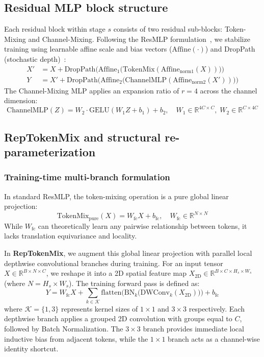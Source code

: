 \subsection{Residual MLP block structure}
\label{subsection:block_structure}
Each residual block within stage $s$ consists of two residual sub-blocks: Token-Mixing and Channel-Mixing. Following the ResMLP formulation~\cite{touvron2021resmlp}, we stabilize training using learnable affine scale and bias vectors ($\text{Affine}(\cdot)$) and DropPath (stochastic depth)~\cite{huang2016deep}:
\begin{align}
    X' &= X + \text{DropPath}\Big(\text{Affine}_1\big(\text{TokenMix}(\text{Affine}_{\text{norm}1}(X))\big)\Big) \\
    Y &= X' + \text{DropPath}\Big(\text{Affine}_2\big(\text{ChannelMLP}(\text{Affine}_{\text{norm}2}(X'))\big)\Big)
\end{align}
The Channel-Mixing MLP applies an expansion ratio of $r = 4$ across the channel dimension:
\begin{equation}
    \text{ChannelMLP}(Z) = W_2 \cdot \text{GELU}(W_1 Z + b_1) + b_2, \quad W_1 \in \mathbb{R}^{4C \times C}, \; W_2 \in \mathbb{R}^{C \times 4C}
\end{equation}

\subsection{RepTokenMix and structural re-parameterization}
\label{subsection:reptokenmix}

\subsubsection{Training-time multi-branch formulation}
In standard ResMLP, the token-mixing operation is a pure global linear projection:
\begin{equation}
    \text{TokenMix}_{\text{pure}}(X) = W_{\text{fc}} X + b_{\text{fc}}, \quad W_{\text{fc}} \in \mathbb{R}^{N \times N}
\end{equation}
While $W_{\text{fc}}$ can theoretically learn any pairwise relationship between tokens, it lacks translation equivariance and locality.

In \textbf{RepTokenMix}, we augment this global linear projection with parallel local depthwise convolutional branches during training. For an input tensor $X \in \mathbb{R}^{B \times N \times C}$, we reshape it into a 2D spatial feature map $X_{2\text{D}} \in \mathbb{R}^{B \times C \times H_s \times W_s}$ (where $N = H_s \times W_s$). The training forward pass is defined as:
\begin{equation}
    \label{eq:reptoken_train}
    Y = W_{\text{fc}} X + \sum_{k \in \mathcal{K}} \text{flatten}\Big(\text{BN}_k\big(\text{DWConv}_k(X_{2\text{D}})\big)\Big) + b_{\text{fc}}
\end{equation}
where $\mathcal{K} = \{1, 3\}$ represents kernel sizes of $1 \times 1$ and $3 \times 3$ respectively. Each depthwise branch applies a grouped 2D convolution with groups equal to $C$, followed by Batch Normalization. The $3 \times 3$ branch provides immediate local inductive bias from adjacent tokens, while the $1 \times 1$ branch acts as a channel-wise identity shortcut.

